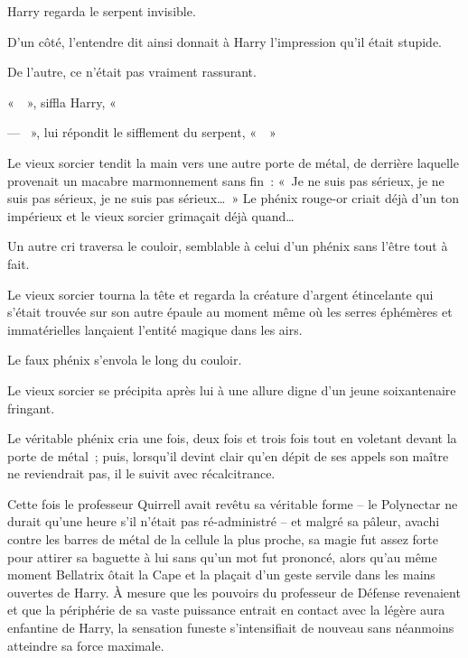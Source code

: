 Harry regarda le serpent invisible.

D'un côté, l'entendre dit ainsi donnait à Harry l'impression qu'il était stupide.

De l'autre, ce n'était pas vraiment rassurant.

«~~», siffla Harry, «~

--- ~», lui répondit le sifflement du serpent, «~~»

\later

Le vieux sorcier tendit la main vers une autre porte de métal, de derrière laquelle provenait un macabre marmonnement sans fin~: «~Je ne suis pas sérieux, je ne suis pas sérieux, je ne suis pas sérieux…~» Le phénix rouge-or criait déjà d'un ton impérieux et le vieux sorcier grimaçait déjà quand…

Un autre cri traversa le couloir, semblable à celui d'un phénix sans l'être tout à fait.

Le vieux sorcier tourna la tête et regarda la créature d'argent étincelante qui s'était trouvée sur son autre épaule au moment même où les serres éphémères et immatérielles lançaient l'entité magique dans les airs.

Le faux phénix s'envola le long du couloir.

Le vieux sorcier se précipita après lui à une allure digne d'un jeune soixantenaire fringant.

Le véritable phénix cria une fois, deux fois et trois fois tout en voletant devant la porte de métal~; puis, lorsqu'il devint clair qu'en dépit de ses appels son maître ne reviendrait pas, il le suivit avec récalcitrance.

\later

Cette fois le professeur Quirrell avait revêtu sa véritable forme -- le Polynectar ne durait qu'une heure s'il n'était pas ré-administré -- et malgré sa pâleur, avachi contre les barres de métal de la cellule la plus proche, sa magie fut assez forte pour attirer sa baguette à lui sans qu'un mot fut prononcé, alors qu'au même moment Bellatrix ôtait la Cape et la plaçait d'un geste servile dans les mains ouvertes de Harry. À mesure que les pouvoirs du professeur de Défense revenaient et que la périphérie de sa vaste puissance entrait en contact avec la légère aura enfantine de Harry, la sensation funeste s'intensifiait de nouveau sans néanmoins atteindre sa force maximale.

